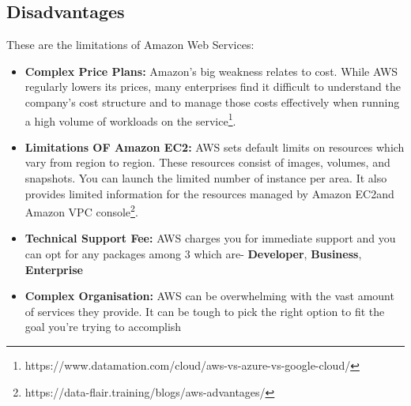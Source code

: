\subsection{Disadvantages}
These are the limitations of Amazon Web Services:
\begin{itemize}
    \item \textbf{Complex Price Plans:} Amazon’s big weakness relates to cost. While AWS regularly lowers its prices, many enterprises find it difficult to understand the company’s cost structure and to manage those costs effectively when running a high volume of workloads on the service\footnote{https://www.datamation.com/cloud/aws-vs-azure-vs-google-cloud/}.
    \item \textbf{Limitations OF Amazon EC2:} AWS sets default limits on resources which vary from region to region. These resources consist of images, volumes, and snapshots. You can launch the limited number of instance per area. It also provides limited information for the resources managed by Amazon EC2and Amazon VPC console\footnote{https://data-flair.training/blogs/aws-advantages/}. 
    \item \textbf{Technical Support Fee:} AWS charges you for immediate support and you can opt for any packages among 3 which are- \textbf{ Developer}, \textbf{Business}, \textbf{Enterprise}
    \item \textbf{Complex Organisation:} AWS can be overwhelming with the vast amount of services they provide. It can be tough to pick the right option to fit the goal you're trying to accomplish

\end{itemize}




